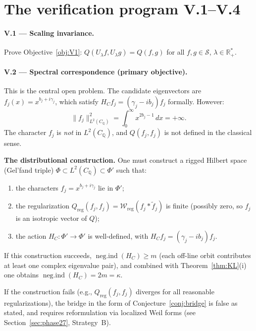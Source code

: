 \documentclass[11pt]{amsart}
\newcommand{\kap}{\kappa}
\newcommand{\negind}{\operatorname{neg.ind}}
\newcommand{\CQ}{C_{\mathbb{Q}}}
\newcommand{\Scal}{\mathcal{S}}
\newcommand{\Wcal}{\mathcal{W}}
\begin{document}
\section{The verification program V.1--V.4}
\label{sec:verification}

\paragraph{\textbf{V.1} — Scaling invariance.}
Prove Objective~\ref{obj:V1}: $Q(U_\lambda f, U_\lambda g) = Q(f,g)$ for all
$f,g \in \Scal$, $\lambda \in \mathbb{R}^*_+$.

\medskip
\paragraph{\textbf{V.2} — Spectral correspondence (primary objective).}
This is the central open problem.  The candidate eigenvectors are
$f_j(x) = x^{b_j+i\gamma_j}$, which satisfy $H_C f_j = (\gamma_j - ib_j) f_j$ formally.
However:
\[
  \|f_j\|_{L^2(\CQ)}^2 = \int_0^\infty x^{2b_j-1}\,dx = +\infty.
\]
The character $f_j$ is \emph{not} in $L^2(\CQ)$, and $Q(f_j,f_j)$ is not defined in the
classical sense.

\textbf{The distributional construction.}  One must construct a rigged Hilbert space
(Gel'fand triple) $\Phi \subset L^2(\CQ) \subset \Phi'$ such that:
\begin{enumerate}
\item[(a)] the characters $f_j = x^{b_j+i\gamma_j}$ lie in $\Phi'$;
\item[(b)] the regularization $Q_\mathrm{reg}(f_j,f_j) = \Wcal_\mathrm{reg}(f_j*\tilde f_j)$
  is finite (possibly zero, so $f_j$ is an isotropic vector of $Q$);
\item[(c)] the action $H_C: \Phi' \to \Phi'$ is well-defined, with $H_C f_j = (\gamma_j-ib_j)f_j$.
\end{enumerate}

If this construction succeeds, $\negind(H_C) \ge m$ (each off-line orbit contributes at
least one complex eigenvalue pair), and combined with Theorem~\ref{thm:KL}(i) one obtains
$\negind(H_C) = 2m = \kap$.

If the construction fails (e.g., $Q_\mathrm{reg}(f_j,f_j)$ diverges for all reasonable
regularizations), the bridge in the form of Conjecture~\ref{conj:bridge} is false as
stated, and requires reformulation via localized Weil forms
(see Section~\ref{sec:phase27}, Strategy~B).
\end{document}
